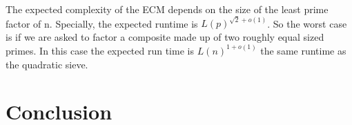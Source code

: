 \documentclass{article}
\begin{document}
The expected complexity of the ECM depends on the size of the least prime factor of n. Specially, the expected runtime is $L(p)^{\sqrt{2} + o(1)}$. So the worst case is if we are asked to factor a composite made up of two roughly equal sized primes. In this case the expected run time is $L(n)^{1 + o(1)}$ the same runtime as the quadratic sieve. 

\section{Conclusion}



\end{document}
